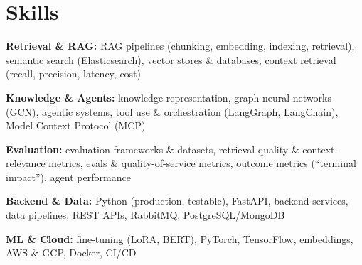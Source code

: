 \documentclass[10pt,a4paper]{article}
\begin{document}
\section{Skills}
\begin{tight}
  \item[\textcolor{accent}{\small$\bullet$}] \textbf{Retrieval \& RAG:} RAG pipelines (chunking, embedding, indexing, retrieval), semantic search (Elasticsearch), vector stores \& databases, context retrieval (recall, precision, latency, cost)
  \item[\textcolor{accent}{\small$\bullet$}] \textbf{Knowledge \& Agents:} knowledge representation, graph neural networks (GCN), agentic systems, tool use \& orchestration (LangGraph, LangChain), Model Context Protocol (MCP)
  \item[\textcolor{accent}{\small$\bullet$}] \textbf{Evaluation:} evaluation frameworks \& datasets, retrieval-quality \& context-relevance metrics, evals \& quality-of-service metrics, outcome metrics (``terminal impact''), agent performance
  \item[\textcolor{accent}{\small$\bullet$}] \textbf{Backend \& Data:} Python (production, testable), FastAPI, backend services, data pipelines, REST APIs, RabbitMQ, PostgreSQL/MongoDB
  \item[\textcolor{accent}{\small$\bullet$}] \textbf{ML \& Cloud:} fine-tuning (LoRA, BERT), PyTorch, TensorFlow, embeddings, AWS \& GCP, Docker, CI/CD
\end{tight}

\end{document}

